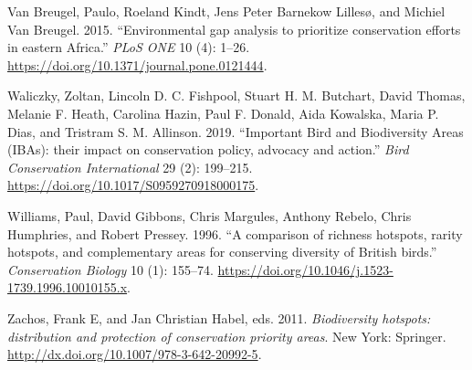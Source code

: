 \documentclass[
]{article}
\begin{document}
\leavevmode\hypertarget{ref-VanBreugel2015}{}%
Van Breugel, Paulo, Roeland Kindt, Jens Peter Barnekow Lillesø, and Michiel Van Breugel. 2015. ``Environmental gap analysis to prioritize conservation efforts in eastern Africa.'' \emph{PLoS ONE} 10 (4): 1--26. \url{https://doi.org/10.1371/journal.pone.0121444}.

\leavevmode\hypertarget{ref-Waliczky2019}{}%
Waliczky, Zoltan, Lincoln D. C. Fishpool, Stuart H. M. Butchart, David Thomas, Melanie F. Heath, Carolina Hazin, Paul F. Donald, Aida Kowalska, Maria P. Dias, and Tristram S. M. Allinson. 2019. ``Important Bird and Biodiversity Areas (IBAs): their impact on conservation policy, advocacy and action.'' \emph{Bird Conservation International} 29 (2): 199--215. \url{https://doi.org/10.1017/S0959270918000175}.

\leavevmode\hypertarget{ref-Williams1996}{}%
Williams, Paul, David Gibbons, Chris Margules, Anthony Rebelo, Chris Humphries, and Robert Pressey. 1996. ``A comparison of richness hotspots, rarity hotspots, and complementary areas for conserving diversity of British birds.'' \emph{Conservation Biology} 10 (1): 155--74. \url{https://doi.org/10.1046/j.1523-1739.1996.10010155.x}.

\leavevmode\hypertarget{ref-Zachos2011}{}%
Zachos, Frank E, and Jan Christian Habel, eds. 2011. \emph{Biodiversity hotspots: distribution and protection of conservation priority areas}. New York: Springer. \url{http://dx.doi.org/10.1007/978-3-642-20992-5}.
\end{document}
